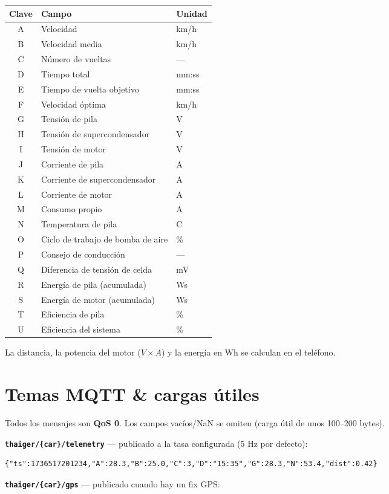 \documentclass[11pt,a4paper,oneside]{report}
\newcommand{\degC}{\textdegree C}
\newcommand{\code}[1]{\texttt{#1}}
\begin{document}
\begin{tabularx}{\linewidth}{@{}clL@{}}
\toprule
\textbf{Clave} & \textbf{Campo} & \textbf{Unidad}\\
\midrule
A & Velocidad & km/h\\
B & Velocidad media & km/h\\
C & Número de vueltas & ---\\
D & Tiempo total & mm:ss\\
E & Tiempo de vuelta objetivo & mm:ss\\
F & Velocidad óptima & km/h\\
G & Tensión de pila & V\\
H & Tensión de supercondensador & V\\
I & Tensión de motor & V\\
J & Corriente de pila & A\\
K & Corriente de supercondensador & A\\
L & Corriente de motor & A\\
M & Consumo propio & A\\
N & Temperatura de pila & \degC{}\\
O & Ciclo de trabajo de bomba de aire & \%\\
P & Consejo de conducción & ---\\
Q & Diferencia de tensión de celda & mV\\
R & Energía de pila (acumulada) & Ws\\
S & Energía de motor (acumulada) & Ws\\
T & Eficiencia de pila & \%\\
U & Eficiencia del sistema & \%\\
\bottomrule
\end{tabularx}

\medskip
La distancia, la potencia del motor ($V \times A$) y la energía en Wh se calculan en
el teléfono.

\section{Temas MQTT \& cargas útiles}
Todos los mensajes son \textbf{QoS 0}. Los campos vacíos/NaN se omiten (carga útil de
unos 100--200 bytes).

\noindent\textbf{\code{thaiger/\{car\}/telemetry}} --- publicado a la tasa
configurada (5 Hz por defecto):

\begin{lstlisting}
{"ts":1736517201234,"A":28.3,"B":25.0,"C":3,"D":"15:35","G":28.3,"N":53.4,"dist":0.42}
\end{lstlisting}
\noindent\textbf{\code{thaiger/\{car\}/gps}} --- publicado cuando hay un fix GPS:
\end{document}
